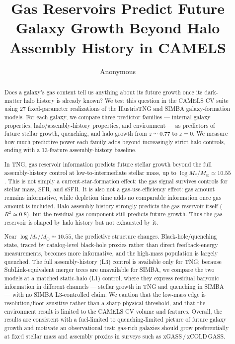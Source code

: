 \documentclass[twocolumn,linenumbers]{aastex701}
\newcommand{\logM}{\log M_*}
\begin{document}
\title{Gas Reservoirs Predict Future Galaxy Growth Beyond Halo Assembly
       History in CAMELS}

\author{Anonymous}

\begin{abstract}
Does a galaxy's gas content tell us anything about its future growth once its
dark-matter halo history is already known? We test this question in the CAMELS
CV suite using 27 fixed-parameter realizations of the IllustrisTNG and SIMBA
galaxy-formation models. For each galaxy, we compare three predictor families
--- internal galaxy properties, halo/assembly-history properties, and
environment --- as predictors of future stellar growth, quenching, and halo
growth from $z \simeq 0.77$ to $z = 0$. We measure how much predictive power
each family adds beyond increasingly strict halo controls, ending with a
13-feature assembly-history baseline.

In TNG, gas reservoir information predicts future stellar growth beyond the
full assembly-history control at low-to-intermediate stellar mass, up to
$\logM/M_\odot \simeq 10.55$. This is not simply a current-star-formation
effect: the gas signal survives controls for stellar mass, SFR, and sSFR. It
is also not a gas-use-efficiency effect: gas amount remains informative, while
depletion time adds no comparable information once gas amount is included.
Halo assembly history strongly predicts the gas reservoir itself
($R^2 \simeq 0.8$), but the residual gas component still predicts future
growth. Thus the gas reservoir is shaped by halo history but not exhausted by
it.

Near $\logM/M_\odot \simeq 10.55$, the predictive structure changes.
Black-hole/quenching state, traced by catalog-level black-hole proxies rather
than direct feedback-energy measurements, becomes more informative, and the
high-mass population is largely quenched. The full assembly-history (L3) control is available only for TNG; because
SubLink-equivalent merger trees are unavailable for SIMBA, we compare the two
models at a matched static-halo (L1) control, where they express residual
baryonic information in different channels --- stellar growth in TNG and
quenching in SIMBA --- with no SIMBA L3-controlled claim. We caution that the low-mass edge is
resolution/floor-sensitive rather than a sharp physical threshold, and that the
environment result is limited to the CAMELS CV volume and features. Overall,
the results are consistent with a fuel-limited to quenching-limited picture of future
galaxy growth and motivate an observational test: gas-rich galaxies should
grow preferentially at fixed stellar mass and assembly proxies in surveys such
as xGASS\,/\,xCOLD\,GASS.
\end{abstract}
\end{document}
